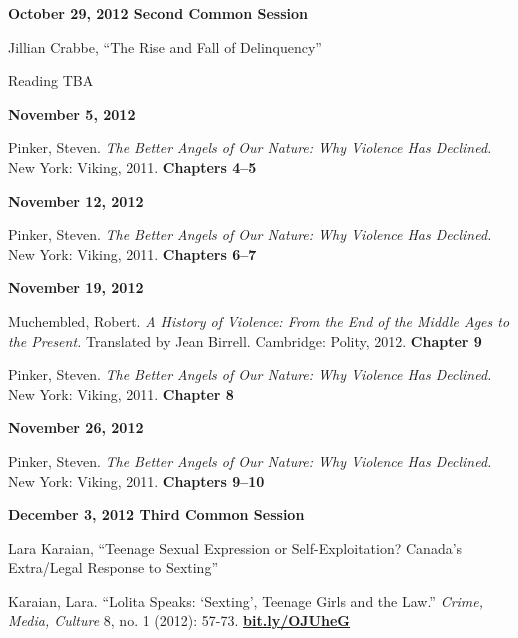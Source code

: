 \documentclass[12pt]{article}
\begin{document}
\textbf{October 29, 2012 \hspace{.125in} Second Common Session}

\begin{hangparas}{.5in}{1}
Jillian Crabbe, ``The Rise and Fall of Delinquency''

Reading TBA
\end{hangparas}

\textbf{November 5, 2012}

\begin{hangparas}{.5in}{1}
Pinker, Steven. \textit{The Better Angels of Our Nature: Why Violence Has Declined.} New York: Viking, 2011. \textbf{Chapters 4--5}
\end{hangparas}

\textbf{November 12, 2012}

\begin{hangparas}{.5in}{1}
Pinker, Steven. \textit{The Better Angels of Our Nature: Why Violence Has Declined.} New York: Viking, 2011. \textbf{Chapters 6--7}
\end{hangparas}

\textbf{November 19, 2012}

\begin{hangparas}{.5in}{1}
Muchembled, Robert. \textit{A History of Violence: From the End of the Middle Ages to the Present.} Translated by Jean Birrell. Cambridge: Polity, 2012. \textbf{Chapter 9}

Pinker, Steven. \textit{The Better Angels of Our Nature: Why Violence Has Declined.} New York: Viking, 2011. \textbf{Chapter 8}
\end{hangparas}

\textbf{November 26, 2012}

\begin{hangparas}{.5in}{1}
Pinker, Steven. \textit{The Better Angels of Our Nature: Why Violence Has Declined.} New York: Viking, 2011. \textbf{Chapters 9--10}
\end{hangparas}

\textbf{December 3, 2012 \hspace{.125in} Third Common Session}

Lara Karaian, ``Teenage Sexual Expression or Self-Exploitation? Canada's Extra/Legal Response to Sexting''

\begin{hangparas}{.5in}{1}
Karaian, Lara. ``Lolita Speaks: `Sexting', Teenage Girls and the Law.'' \textit{Crime, Media, Culture} 8, no. 1 (2012): 57-73. \href{bit.ly/OJUheG}{\textbf{bit.ly/OJUheG}}
\end{hangparas}
\end{document}
